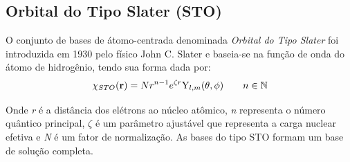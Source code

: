 \subsection{Orbital do Tipo Slater (STO)\label{sto}}

O conjunto de bases de átomo-centrada denominada \textit{Orbital do Tipo Slater} foi introduzida em 1930 pelo físico John C. Slater \cite{base_slater} e baseia-se na função de onda do átomo de hidrogênio, tendo sua forma dada por:
\begin{equation}
	\chi_{STO}(\vb{r}) = N r^{n-1}e^{\zeta r}\mathrm{Y}_{l,m}(\theta,\phi) \qquad n\in \mathbb{N}
\end{equation}

Onde \textit{r} é a distância dos elétrons ao núcleo atômico, \textit{n} representa o número quântico principal, $ \zeta $ é um parâmetro ajustável que representa a carga nuclear efetiva e \textit{N} é um fator de normalização. As bases do tipo STO formam um base de solução completa.

